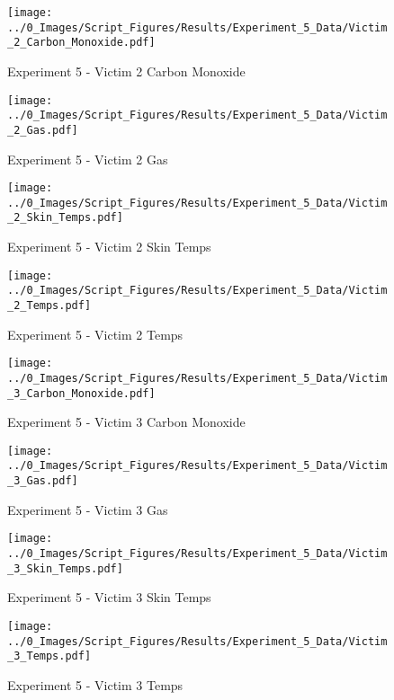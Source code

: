 	\begin{figure}[H]
		\centering
		\texttt{[image: ../0\_Images/Script\_Figures/Results/Experiment\_5\_Data/Victim\_2\_Carbon\_Monoxide.pdf]}
		\caption[]{Experiment 5 - Victim 2 Carbon Monoxide}
	\end{figure}
 
	\clearpage

	\begin{figure}[H]
		\centering
		\texttt{[image: ../0\_Images/Script\_Figures/Results/Experiment\_5\_Data/Victim\_2\_Gas.pdf]}
		\caption[]{Experiment 5 - Victim 2 Gas}
	\end{figure}
 

	\begin{figure}[H]
		\centering
		\texttt{[image: ../0\_Images/Script\_Figures/Results/Experiment\_5\_Data/Victim\_2\_Skin\_Temps.pdf]}
		\caption[]{Experiment 5 - Victim 2 Skin Temps}
	\end{figure}
 
	\clearpage

	\begin{figure}[H]
		\centering
		\texttt{[image: ../0\_Images/Script\_Figures/Results/Experiment\_5\_Data/Victim\_2\_Temps.pdf]}
		\caption[]{Experiment 5 - Victim 2 Temps}
	\end{figure}
 

	\begin{figure}[H]
		\centering
		\texttt{[image: ../0\_Images/Script\_Figures/Results/Experiment\_5\_Data/Victim\_3\_Carbon\_Monoxide.pdf]}
		\caption[]{Experiment 5 - Victim 3 Carbon Monoxide}
	\end{figure}
 
	\clearpage

	\begin{figure}[H]
		\centering
		\texttt{[image: ../0\_Images/Script\_Figures/Results/Experiment\_5\_Data/Victim\_3\_Gas.pdf]}
		\caption[]{Experiment 5 - Victim 3 Gas}
	\end{figure}
 

	\begin{figure}[H]
		\centering
		\texttt{[image: ../0\_Images/Script\_Figures/Results/Experiment\_5\_Data/Victim\_3\_Skin\_Temps.pdf]}
		\caption[]{Experiment 5 - Victim 3 Skin Temps}
	\end{figure}
 
	\clearpage

	\begin{figure}[H]
		\centering
		\texttt{[image: ../0\_Images/Script\_Figures/Results/Experiment\_5\_Data/Victim\_3\_Temps.pdf]}
		\caption[]{Experiment 5 - Victim 3 Temps}
	\end{figure}
 

